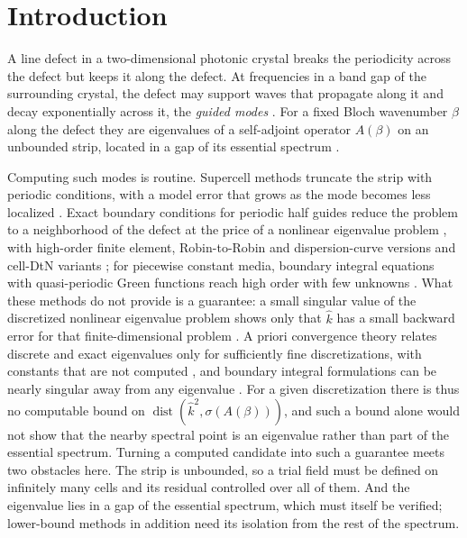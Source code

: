 \section{Introduction}\label{sec:intro}
A line defect in a two-dimensional photonic crystal breaks the periodicity
across the defect but keeps it along the defect. At frequencies in a band gap
of the surrounding crystal, the defect may support waves that propagate along
it and decay exponentially across it, the \emph{guided modes}
\cite{JoannopoulosJohnsonWinnMeade2008}. For a fixed Bloch wavenumber $\beta$
along the defect they are eigenvalues of a self-adjoint operator $A(\beta)$ on
an unbounded strip, located in a gap of its essential spectrum
\cite{Fliss2013}.

Computing such modes is routine. Supercell methods truncate the strip with
periodic conditions, with a model error that grows as the mode becomes less
localized \cite{Fliss2013,KlindworthSchmidtFliss2014}. Exact boundary
conditions for periodic half guides \cite{JolyLiFliss2006} reduce the problem to
a neighborhood of the defect at the price of a nonlinear eigenvalue problem
\cite{Fliss2013}, with high-order finite element, Robin-to-Robin and
dispersion-curve versions
\cite{KlindworthSchmidtFliss2014,FlissKlindworthSchmidt2015,Klindworth2015} and
cell-DtN variants \cite{HuangLuLi2007,YuanLu2007}; for piecewise constant media,
boundary integral equations with quasi-periodic Green functions reach high order
with few unknowns
\cite{Linton1998,BarnettGreengard2010,HaoBarnettMartinssonYoung2014}. What these
methods do not provide is a guarantee: a small singular value of the
discretized nonlinear eigenvalue problem shows only that $\widehat k$ has a small
backward error for that finite-dimensional problem
\cite[\S2.7]{GuettelTisseur2017}. A priori convergence theory relates discrete
and exact eigenvalues only for sufficiently fine discretizations, with
constants that are not computed \cite[\S4]{ZhaoBarnett2015}, and boundary
integral formulations can be nearly singular away from any eigenvalue
\cite{ZhaoBarnett2015,HiptmairMoiolaSpence2022}. For a given discretization
there is thus no computable bound on
$\operatorname{dist}(\widehat k^2,\sigma(A(\beta)))$, and such a bound alone would
not show that the nearby spectral point is an eigenvalue rather than part of the
essential spectrum. Turning a computed candidate into such a guarantee meets
two obstacles here. The strip is unbounded, so a trial field must be defined on
infinitely many cells and its residual controlled over all of them. And the
eigenvalue lies in a gap of the essential spectrum, which must itself be
verified; lower-bound methods in addition need its isolation from the rest of
the spectrum.

